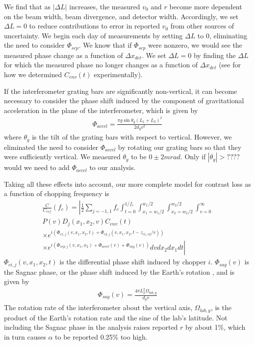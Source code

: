 \documentclass[twocolumn,prl,showpacs,superscriptaddress]{revtex4-1}   %
\begin{document}
We find that as $\left|\Delta L\right|$ increases, the measured $v_0$ and $r$ become more dependent on the beam width, beam divergence, and detector width. Accordingly, we set $\Delta L = 0$ to reduce contributions to error in reported $v_0$ from other sources of uncertainty. We begin each day of measurements by setting $\Delta L$ to 0, eliminating the need to consider $\Phi_{sep}$. We know that if $\Phi_{sep}$ were nonzero, we would see the measured phase change as a function of $\Delta x_{det}$. We set $\Delta L = 0$ by finding the $\Delta L$ for which the measured phase no longer changes as a function of $\Delta x_{det}$ (see \cite{Hromada2014} for how we determined $C_{env}(t)$ experimentally).


If the interferometer grating bars are significantly non-vertical, it can become necessary to consider the phase shift induced by the component of gravitational acceleration in the plane of the interferometer, which is given by
\begin{align}
	\Phi_{accel} = \frac{\pi g\sin{\theta_g}(L_1+L_2)^2}{2d_g v^2}
	\label{phiAccel}
\end{align}
where $\theta_g$ is the tilt of the grating bars with respect to vertical. However, we eliminated the need to consider $\Phi_{accel}$ by rotating our grating bars so that they were sufficiently vertical. We measured $\theta_g$ to be $0 \pm 2 mrad$. Only if $|\theta_g| > ????$ would we need to add $\Phi_{accel}$ to our analysis.

Taking all these effects into account, our more complete model for contrast loss as a function of chopping frequency is
\begin{align}
	\frac{C}{C_{ref}}(f_c) = 
	\left|
		\frac{1}{2} \sum_{j=-1,1}
		f_c \int_{t=0}^{1/f_c} 
		\int_{x_1=w_1/2}^{w_1/2}
		\int_{x_2=w_2/2}^{w_2/2}
		\int_{v=0}^{\infty}           
		\right. \nonumber \\
		P(v)
		D_j(x_1, x_2, v)
		C_{env}(t)                   
		\nonumber \\ \times
		e^{i( \Phi_{c1,j}(v,x_1,x_2,t) + \Phi_{c2,j}(v,x_1,x_2,t-z_{c1,c2}/v) )}
		\nonumber \\ \times \left.
		e^{i( \Phi_{sep,j}(v,x_1,x_2) + \Phi_{accel}(v) + \Phi_{sag}(v) )}
		dv dx_{2} dx_{1} dt
	\right|
	\label{CvCF}
\end{align}
$\Phi_{ci,j}(v,x_1,x_2,t)$ is the differential phase shift induced by chopper $i$. $\Phi_{sag}(v)$ is the Sagnac phase, or the phase shift induced by the Earth's rotation \cite{Lenef1997,Jacquey2008}, and is given by
\begin{align}
	\Phi_{sag}(v) = \frac{4\pi L_2^2\Omega_{lab,y}}{d_g v}
	\label{phiSag}
\end{align}
The rotation rate of the interferometer about the vertical axis, $\Omega_{lab,y}$, is the product of the Earth's rotation rate and the sine of the lab's latitude. Not including the Sagnac phase in the analysis raises reported $r$ by about 1\%, which in turn causes $\alpha$ to be reported 0.25\% too high.
\end{document}
